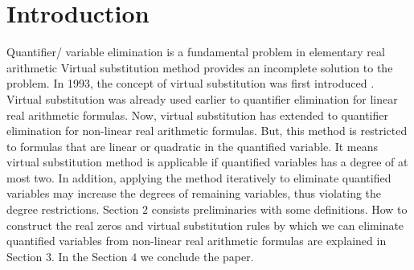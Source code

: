 \section{Introduction}
\label{sec:introduction}
Quantifier/ variable elimination is a fundamental problem in elementary real arithmetic Virtual substitution method provides an incomplete solution to the problem. In 1993, the concept of virtual substitution was first introduced \cite{weispfenning}. Virtual substitution was already used earlier to quantifier elimination for linear real arithmetic formulas. Now, virtual substitution has extended to quantifier elimination for non-linear real arithmetic formulas. But, this method is restricted
to formulas that are linear or quadratic in the quantified variable. It means virtual substitution method is applicable if quantified variables has a degree of at most two. In addition, applying the method iteratively to eliminate quantified variables may increase the degrees of remaining variables, thus violating the degree restrictions.\newline
Section $2$ consists preliminaries with some definitions. How to construct the real zeros and virtual substitution rules by which we can eliminate quantified variables from non-linear real arithmetic formulas are explained in Section $3$. In the Section $4$ we conclude the paper.
